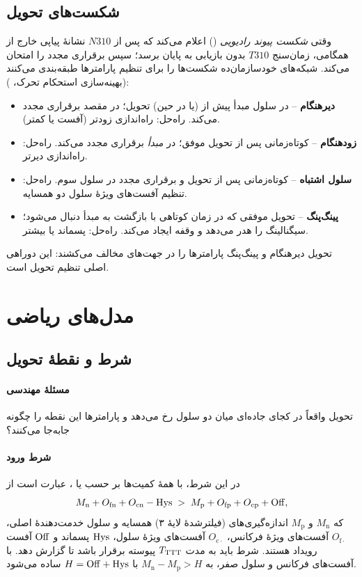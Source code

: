 \documentclass[11pt,a4paper]{article}
\begin{document}
\subsection{شکست‌های تحویل}
 وقتی \emph{شکست پیوند رادیویی} () اعلام می‌کند که پس از $N310$ نشانهٔ پیاپی
خارج از همگامی، زمان‌سنج $T310$ بدون بازیابی به پایان برسد؛ سپس برقراری مجدد  را امتحان
می‌کند. شبکه‌های خودسازمان‌ده شکست‌ها را برای تنظیم پارامترها طبقه‌بندی می‌کنند (بهینه‌سازی
استحکام تحرک، ):
\begin{itemize}
  \item \textbf{دیرهنگام} --  در سلول مبدأ پیش از (یا در حین) تحویل؛  در مقصد برقراری
        مجدد می‌کند. راه‌حل: راه‌اندازی زودتر (آفست یا  کمتر).
  \item \textbf{زودهنگام} --  کوتاه‌زمانی پس از تحویل موفق؛  در \emph{مبدأ} برقراری
        مجدد می‌کند. راه‌حل: راه‌اندازی دیرتر.
  \item \textbf{سلول اشتباه} --  کوتاه‌زمانی پس از تحویل و برقراری مجدد در سلول سوم.
        راه‌حل: تنظیم آفست‌های ویژهٔ سلول دو همسایه.
  \item \textbf{پینگ‌پنگ} -- تحویل موفقی که در زمان کوتاهی با بازگشت به مبدأ دنبال می‌شود؛ سیگنالینگ
        را هدر می‌دهد و وقفه ایجاد می‌کند. راه‌حل: پسماند یا  بیشتر.
\end{itemize}
تحویل دیرهنگام و پینگ‌پنگ پارامترها را در جهت‌های مخالف می‌کشند: این دوراهی اصلی تنظیم تحویل است.

\section{مدل‌های ریاضی}

\subsection{شرط  و نقطهٔ تحویل}\label{sec:a3}
\paragraph{مسئلهٔ مهندسی} تحویل واقعاً در کجای جاده‌ای میان دو سلول رخ می‌دهد و پارامترها این نقطه
را چگونه جابه‌جا می‌کنند؟
\paragraph{شرط ورود } در  \cite{ts36331} این شرط، با همهٔ کمیت‌ها بر حسب  یا ، عبارت است از
\begin{equation}\label{eq:a3}
  M_\mathrm{n} + O_{\mathrm{fn}} + O_{\mathrm{cn}} - \mathrm{Hys} \;>\; M_\mathrm{p} + O_{\mathrm{fp}} + O_{\mathrm{cp}} + \mathrm{Off} ,
\end{equation}
که $M_\mathrm{n}$ و $M_\mathrm{p}$ اندازه‌گیری‌های (فیلترشدهٔ لایهٔ ۳) همسایه و سلول خدمت‌دهندهٔ اصلی،
$O_{\mathrm{f}\cdot}$ آفست‌های ویژهٔ فرکانس، $O_{\mathrm{c}\cdot}$ آفست‌های ویژهٔ سلول، $\mathrm{Hys}$ پسماند و
$\mathrm{Off}$ آفست رویداد هستند. شرط باید به مدت $T_{\mathrm{TTT}}$ پیوسته برقرار باشد تا  گزارش دهد. با
آفست‌های فرکانس و سلول صفر، به $M_\mathrm{n} - M_\mathrm{p} > H$ با $H = \mathrm{Off} + \mathrm{Hys}$ ساده می‌شود.
\end{document}
